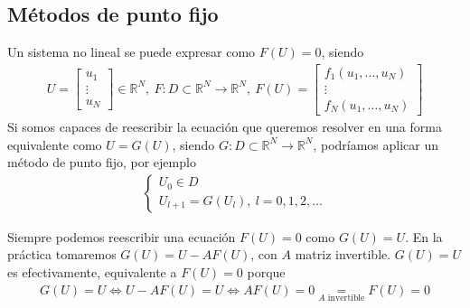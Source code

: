 \subsection{Métodos de punto fijo}

Un sistema no lineal se puede expresar como $F(U) = 0$, siendo
\begin{align*}
    U = \begin{bmatrix}
            u_1    \\
            \vdots \\
            u_N
        \end{bmatrix} \in \mathbb{R}^N, \ F : D \subset \mathbb{R}^N \longrightarrow \mathbb{R}^N, \ F(U) = \begin{bmatrix}
                                                                                                                f_1(u_1,\ldots,u_N) \\
                                                                                                                \vdots              \\
                                                                                                                f_N(u_1,\ldots,u_N)
                                                                                                            \end{bmatrix}
\end{align*}
Si somos capaces de reescribir la ecuación que queremos resolver en una forma equivalente como $U = G(U)$, siendo $G: D \subset \mathbb{R}^N \longrightarrow \mathbb{R}^N$, podríamos aplicar un método de punto fijo, por ejemplo
\begin{align*}
    \left\{ \begin{array}{lcc}
                U_0 \in D \\
                U_{l+1} = G(U_l), \ l = 0,1,2,\ldots
            \end{array}
    \right.
\end{align*}

\begin{obs}
    Siempre podemos reescribir una ecuación $F(U) = 0$ como $G(U) = U$. En la práctica tomaremos $G(U) = U -AF(U)$, con $A$ matriz invertible. $G(U) = U$ es efectivamente, equivalente a $F(U) = 0$ porque
    \begin{align*}
        G(U) = U \Longleftrightarrow U - AF(U) = U \Longleftrightarrow AF(U) = 0 \underset{A \text{ invertible}}{=} F(U) = 0
    \end{align*}
\end{obs}

